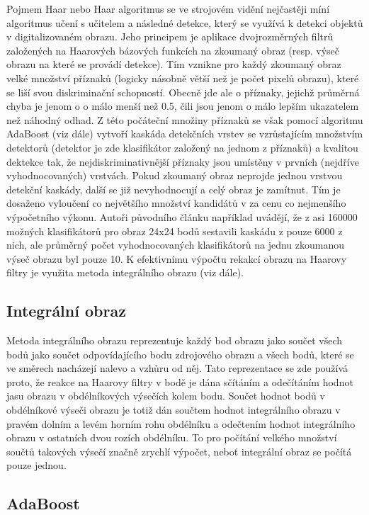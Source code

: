 	Pojmem Haar nebo Haar algoritmus se ve strojovém vidění nejčastěji míní algoritmus učení s učitelem a následné detekce, který se využívá k detekci objektů v digitalizovaném obrazu. Jeho principem je aplikace dvojrozměrných filtrů založených na Haarových bázových funkcích na zkoumaný obraz (resp. výseč obrazu na které se provádí detekce). Tím vznikne pro každý zkoumaný obraz velké množství příznaků (logicky násobně větší než je počet pixelů obrazu), které se liší svou diskriminační schopností. Obecně jde ale o příznaky, jejichž průměrná chyba je jenom o o málo menší než 0.5, čili jsou jenom o málo lepším ukazatelem než náhodný odhad. Z této počáteční množiny příznaků se však pomocí algoritmu AdaBoost (viz dále) vytvoří kaskáda detekčních vrstev se vzrůstajícím množstvím detektorů (detektor je zde klasifikátor založený na jednom z příznaků) a kvalitou dektekce tak, že nejdiskriminativnější příznaky jsou umístěny v prvních (nejdříve vyhodnocovaných) vrstvách. Pokud zkoumaný obraz neprojde jednou vrstvou detekční kaskády, další se již nevyhodnocují a celý obraz je zamítnut. Tím je dosaženo vyloučení co největšího množství kandidátů v za cenu co nejmenšího výpočetního výkonu. Autoři původního článku například uvádějí, že z asi 160000 možných klasifikátorů pro obraz 24x24 bodů sestavili kaskádu z pouze 6000 z nich, ale průměrný počet vyhodnocovaných klasifikátorů na jednu zkoumanou výseč obrazu byl pouze 10. K efektivnímu výpočtu rekakcí obrazu na Haarovy filtry je využita metoda integrálního obrazu (viz dále).
	
\subsection{Integrální obraz}
	Metoda integrálního obrazu reprezentuje každý bod obrazu jako součet všech bodů jako součet odpovídajícího bodu zdrojového obrazu a všech bodů, které se ve směrech nacházejí nalevo a vzhůru od něj. Tato reprezentace se zde používá proto, že reakce na Haarovy filtry v bodě je dána sčítáním a odečítáním hodnot jasu obrazu v obdélníkových výsečích kolem bodu. Součet hodnot bodů v obdélníkové výseči obrazu je totiž dán součtem hodnot integrálního obrazu v pravém dolním a levém horním rohu obdélníku a odečtením hodnot integrálního obrazu v ostatních dvou rozích obdélníku. To pro počítání velkého množství součtů takových výsečí značně zrychlí výpočet, neboť integrální obraz se počítá pouze jednou.
	
\subsection{AdaBoost}

